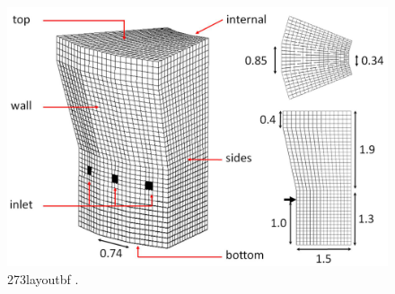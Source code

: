 \begin{figure}[!htb]
\centering
\includegraphics[width=.80\columnwidth]{images/273layoutbf}
\caption[273layoutbf]{273layoutbf \cite{RefWorks:208}.}
\label{fig:273layoutbf}
\end{figure}